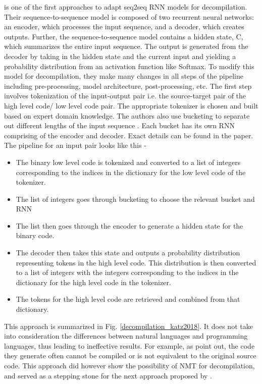 \documentclass{article}
\begin{document}
\citet{katz2018using} is one of the first approaches to adapt seq2seq RNN models for decompilation. Their sequence-to-sequence model is composed of two recurrent neural networks: an encoder, which processes the input sequence, and a decoder,
which creates outputs. Further, the sequence-to-sequence model contains a hidden state, C, which summarizes the entire input sequence. The output is generated from the decoder by taking in the hidden state and the current input and yielding a probability distribution from an activation function like Softmax. To modify this model for decompilation, they make many changes in all steps of the pipeline including pre-processing, model architecture, post-processing, etc. The first step involves tokenization of the input-output pair i.e. the source-target pair of the high level code/ low level code pair. The appropriate tokenizer is chosen and built based on expert domain knowledge. The authors also use bucketing to separate out different lengths of the input sequence \cite{bucketing}. Each bucket has its own RNN comprising of the encoder and decoder. Exact details can be found in the paper. The pipeline for an input pair looks like this - 
\begin{itemize}
    \item The binary low level code is tokenized and converted to a list of integers corresponding to the indices in the dictionary for the low level code of the tokenizer.
    \item The list of integers goes through bucketing to choose the relevant bucket and RNN
    \item The list then goes through the encoder to generate a hidden state for the binary code.
    \item The decoder then takes this state and outputs a probability distribution representing tokens in the high level code. This distribution is then converted to a list of integers with the integers corresponding to the indices in the dictionary for the high level code in the tokenizer.
    \item The tokens for the high level code are retrieved and combined from that dictionary.
\end{itemize}

This approach is summarized in Fig. \ref{decompilation_katz2018}. It does not take into consideration the differences between natural languages and programming languages, thus leading to ineffective results. For example, as \citet{katz2019towards} point out, the code they generate often cannot be compiled or is not equivalent to the original source code. This approach did however show the possibility of NMT for decompilation, and served as a stepping stone for the next approach proposed by \citet{katz2019towards}. 
\end{document}
